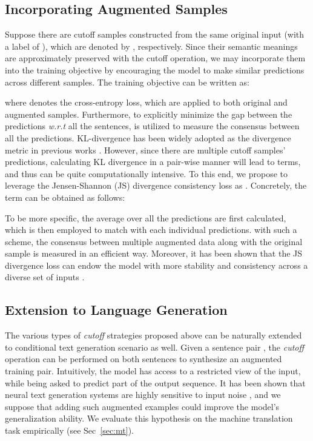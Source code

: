 \documentclass[11pt,a4paper]{article}
\begin{document}
\vspace{-1mm}
\subsection{Incorporating Augmented Samples}
Suppose there are  cutoff samples constructed from the same original input  (with a label of ), which are denoted by , respectively. Since their semantic meanings are approximately preserved with the cutoff operation, we may incorporate them into the training objective by encouraging the model to make similar predictions across different samples. The training objective can be written as:


\noindent where  denotes the cross-entropy loss, which are applied to both original and augmented samples. Furthermore, to explicitly minimize the gap between the predictions \emph{w.r.t} all the sentences,  is utilized to measure the consensus between all the predictions. KL-divergence has been widely adopted as the divergence metric in previous works \cite{Miyato2017AdversarialTM, miyato2018virtual, Clark2018SemiSupervisedSM, xie2019unsupervised}. However, since there are multiple cutoff samples' predictions, calculating KL divergence in a pair-wise manner will lead to   terms, and thus can be quite computationally intensive. To this end, we propose to leverage the Jensen-Shannon (JS) divergence consistency loss as . 
Concretely, the  term can be obtained as follows:

To be more specific, the average over all the predictions are first calculated, which is then employed to match with each individual predictions. with such a scheme, the consensus between multiple augmented data along with the original sample is measured in an efficient way. Moreover, it has been shown that the JS divergence loss can endow the model with more stability and consistency across a diverse set of inputs \cite{Bachman2014LearningWP, Zheng2016ImprovingTR, Kannan2018AdversarialLP, Hendrycks2020AugMixAS}. 
\vspace{-0.5mm}
\subsection{Extension to Language Generation}
\vspace{-0.5mm}
The various types of \emph{cutoff} strategies proposed above can be naturally extended to conditional text generation scenario as well. Given a sentence pair , the \emph{cutoff} operation can be performed on both sentences to synthesize an augmented training pair. Intuitively, the model has access to a restricted view of the input, while being asked to predict part of the output sequence. It has been shown that neural text generation systems are highly sensitive to input noise \cite{lee2018hallucinations}, and we suppose that adding such augmented examples could improve the model's generalization ability. We evaluate this hypothesis on the machine translation task empirically (see Sec~\ref{sec:mt}).
\end{document}
